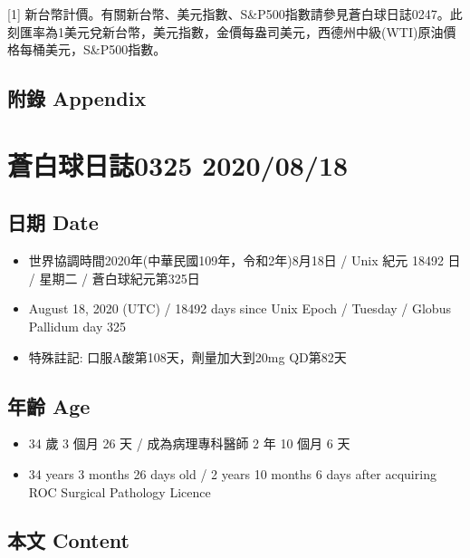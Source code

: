 \documentclass[a5paper, 11pt
]{book}
\providecommand{\tightlist}{%
  \setlength{\itemsep}{0pt}\setlength{\parskip}{0pt}}
\begin{document}
{[}1{]}
新台幣計價。有關新台幣、美元指數、S\&P500指數請參見蒼白球日誌0247。此刻匯率為1美元兌新台幣，美元指數，金價每盎司美元，西德州中級(WTI)原油價格每桶美元，S\&P500指數。

\hypertarget{ux9644ux9304-appendix-77}{%
\subsection{附錄 Appendix}\label{ux9644ux9304-appendix-77}}

\hypertarget{ux84bcux767dux7403ux65e5ux8a8c0325-20200818}{%
\section{蒼白球日誌0325
2020/08/18}\label{ux84bcux767dux7403ux65e5ux8a8c0325-20200818}}

\hypertarget{ux65e5ux671f-date-78}{%
\subsection{日期 Date}\label{ux65e5ux671f-date-78}}

\begin{itemize}
\tightlist
\item
  世界協調時間2020年(中華民國109年，令和2年)8月18日 / Unix 紀元 18492 日
  / 星期二 / 蒼白球紀元第325日
\item
  August 18, 2020 (UTC) / 18492 days since Unix Epoch / Tuesday / Globus
  Pallidum day 325
\item
  特殊註記: 口服A酸第108天，劑量加大到20mg QD第82天
\end{itemize}

\hypertarget{ux5e74ux9f61-age-78}{%
\subsection{年齡 Age}\label{ux5e74ux9f61-age-78}}

\begin{itemize}
\tightlist
\item
  34 歲 3 個月 26 天 / 成為病理專科醫師 2 年 10 個月 6 天
\item
  34 years 3 months 26 days old / 2 years 10 months 6 days after
  acquiring ROC Surgical Pathology Licence
\end{itemize}

\hypertarget{ux672cux6587-content-78}{%
\subsection{本文 Content}\label{ux672cux6587-content-78}}
\end{document}
